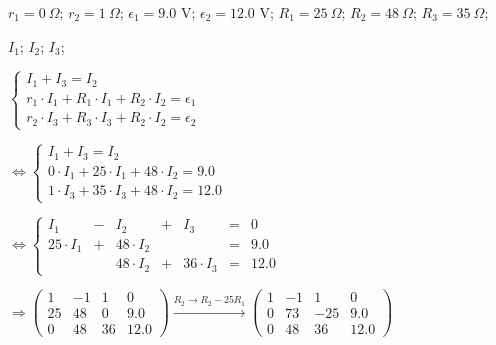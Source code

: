 \begin{description}[labelwidth=1.5cm, leftmargin=!]
     \item[Geg. :]   $ r_1 = 0 \ \Omega $; $ r_2 = 1 \ \Omega $; $ \epsilon_1 = 9.0 $ V; $ \epsilon_2 = 12.0 $ V; $ R_1 = 25 \ \Omega $; $ R_2 = 48 \ \Omega $; $ R_3 = 35\  \Omega $;
    \item[Gevr. :]  $ I_1 $; $ I_2 $; $ I_3 $;
    \item[Opl. :]   $ \left\{\begin{array}{l}
                        I_1 + I_3 = I_2 \\
                        r_1 \cdot I_1 + R_1 \cdot I_1 + R_2 \cdot I_2 = \epsilon_1 \\
                        r_2 \cdot I_3 + R_3 \cdot I_3 + R_2 \cdot I_2 = \epsilon_2
                    \end{array}\right. $
                    
                    \hspace{-0.57cm} $ \Leftrightarrow 
                    \left\{\begin{array}{l}
                        I_1 + I_3 = I_2 \\
                        0 \cdot I_1 + 25 \cdot I_1 + 48 \cdot I_2 = 9.0 \\
                        1 \cdot I_3 + 35 \cdot I_3 + 48 \cdot I_2 = 12.0
                    \end{array}\right. $
                    
                    \hspace{-0.57cm} $ \Leftrightarrow 
                    \left\{\begin{array}{rcrcrcl}
                        I_1 & - & I_2 & + & I_3 & = & 0 \\
                        25 \cdot I_1 & + & 48 \cdot I_2 & & & = & 9.0 \\
                        & & 48 \cdot I_2 & + & 36 \cdot I_3 & = & 12.0
                    \end{array}\right. $
                    
                    \hspace{-0.57cm} $ \Rightarrow 
                    \left(\begin{array}{ccc|c}
                        1  & -1 & 1  & 0   \\
                        25 & 48 & 0  & 9.0 \\
                        0  & 48 & 36 & 12.0
                    \end{array}\right)
                    \xrightarrow{R_2 \to R_2 - 25 R_1} 
                    \left(\begin{array}{ccc|c}
                        1  & -1 & 1   & 0   \\
                        0  & 73 & -25 & 9.0 \\
                        0  & 48 & 36  & 12.0
                    \end{array}\right) $
                    

\end{description}
